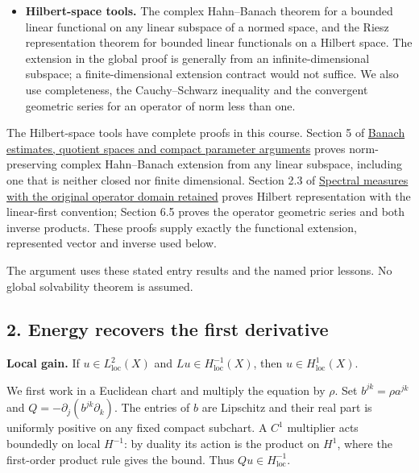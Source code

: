 \documentclass[
  11pt,
]{article}
\begin{document}
\begin{itemize}
  Riemannian metric exist. Only their local coordinate bounds are used.
  A manifold is locally path connected and locally compact; its
  connected components are open, and each connected component is path
  connected. The compact-hull construction needed below is proved in
  this lesson.
\item
  \textbf{Hilbert-space tools.} The complex Hahn--Banach theorem for a
  bounded linear functional on any linear subspace of a normed space,
  and the Riesz representation theorem for bounded linear functionals on
  a Hilbert space. The extension in the global proof is generally from
  an infinite-dimensional subspace; a finite-dimensional extension
  contract would not suffice. We also use completeness, the
  Cauchy--Schwarz inequality and the convergent geometric series for an
  operator of norm less than one.
\end{itemize}

The Hilbert-space tools have complete proofs in this course. Section 5
of \href{banach-foundation-bridges.pdf}{Banach estimates, quotient spaces
and compact parameter arguments} proves norm-preserving complex
Hahn--Banach extension from any linear subspace, including one that is
neither closed nor finite dimensional. Section 2.3 of
\href{lower-bounded-spectral-calculus.pdf}{Spectral measures with the
original operator domain retained} proves Hilbert representation with
the linear-first convention; Section 6.5 proves the operator geometric
series and both inverse products. These proofs supply exactly the
functional extension, represented vector and inverse used below.

The argument uses these stated entry results and the named prior
lessons. No global solvability theorem is assumed.

\subsection{2. Energy recovers the first
derivative}\label{energy-recovers-the-first-derivative}

\textbf{Local gain.} If \(u\in L^2_{\mathrm{loc}}(X)\) and
\(Lu\in H^{-1}_{\mathrm{loc}}(X)\), then \(u\in H^1_{\mathrm{loc}}(X)\).

We first work in a Euclidean chart and multiply the equation by
\(\rho\). Set \(b^{jk}=\rho a^{jk}\) and
\(Q=-\partial_j(b^{jk}\partial_k)\). The entries of \(b\) are Lipschitz
and their real part is uniformly positive on any fixed compact subchart.
A \(C^1\) multiplier acts boundedly on local \(H^{-1}\): by duality its
action is the product on \(H^1\), where the first-order product rule
gives the bound. Thus \(Qu\in H^{-1}_{\mathrm{loc}}\).
\end{document}
